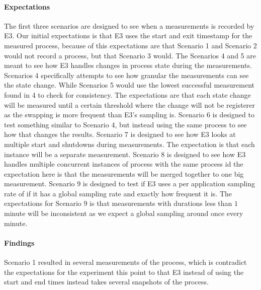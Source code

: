 \paragraph {Expectations}
The first three scenarios are designed to see when a measurements is recorded by E3. Our initial expectations is that E3 uses the start and exit timestamp for the measured process, because of this expectations are that Scenario 1 and Scenario 2 would not record a process, but that Scenario 3 would.
The Scenarios 4 and 5 are meant to see how E3 handles changes in process state during the measurements. Scenarios 4 specifically attempts to see how granular the measurements can see the state change. While Scenarios 5 would use the lowest successful measurement found in 4 to check for consistency. The expectations are that each state change will be measured until a certain threshold where the change will not be registerer as the swapping is more frequent than E3's sampling is. Scenario 6 is designed to test something similar to Scenario 4, but instead using the same process to see how that changes the results.
Scenario 7 is designed to see how E3 looks at multiple start and shutdowns during measurements. The expectation is that each instance will be a separate measurement. Scenario 8 is designed to see how E3 handles multiple concurrent instances of process with the same process id the expectation here is that the measurements will be merged together to one big measurement. Scenario 9 is designed to test if E3 uses a per application sampling rate of if it has a global sampling rate and exactly how frequent it is. The expectations for Scenario 9 is that measurements with durations less than $1$ minute will be inconsistent as we expect a global sampling around once every minute.

\paragraph {Findings}
Scenario 1 resulted in several measurements of the process, which is contradict the expectations for the experiment this point to that E3 instead of using the start and end times instead takes several snapshots of the process.